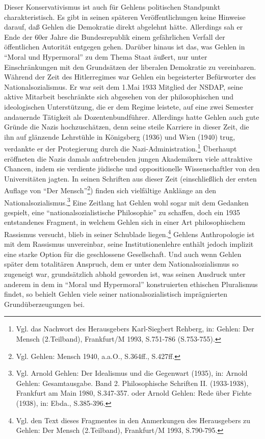 \documentclass[12pt,a4paper]{article}
\begin{document}
Dieser Konservativismus ist auch für Gehlens politischen Standpunkt
charakteristisch. Es gibt in seinen späteren Veröffentlichungen keine
Hinweise darauf, daß Gehlen die Demokratie direkt abgelehnt hätte.
Allerdings sah er Ende der 60er Jahre die Bundesrepublik einem
gefährlichen Verfall der öffentlichen Autorität entgegen gehen. Darüber
hinaus ist das, was Gehlen in "`Moral und Hypermoral"' zu dem Thema
Staat äußert, nur unter Einschränkungen mit den Grundsätzen der
liberalen Demokratie zu vereinbaren. Während der Zeit des Hitlerregimes
war Gehlen ein begeisterter Befürworter des Nationalsozialismus. Er war
seit dem 1.Mai 1933 Mitglied der NSDAP, seine aktive Mitarbeit
beschränkte sich abgesehen von der philosophischen und ideologischen
Unterstützung, die er dem Regime leistete, auf eine zwei Semester
andauernde Tätigkeit als Dozentenbundführer. Allerdings hatte Gehlen
auch gute Gründe die Nazis hochzuschätzen, denn seine steile Karriere in
dieser Zeit, die ihn auf glänzende Lehrstühle in Königsberg (1936) und
Wien (1940) trug, verdankte er der Protegierung durch die
Nazi-Administration.\footnote{Vgl. das Nachwort des Herausgebers
  Karl-Siegbert Rehberg, in: Gehlen: Der Mensch (2.Teilband),
  Frankfurt/M 1993, S.751-786 (S.753-755).} Überhaupt eröffneten die
Nazis damals aufstrebenden jungen Akademikern viele attraktive Chancen,
indem sie verdiente jüdische und oppositionelle Wissenschaftler von den
Universitäten jagten. In seinen Schriften aus dieser Zeit
(einschließlich der ersten Auflage von "`Der Mensch"'\footnote{Vgl.
  Gehlen: Mensch 1940, a.a.O., S.364ff., S.427ff.})  finden sich
vielfältige Anklänge an den Nationalsozialismus.\footnote{Vgl. Arnold
  Gehlen: Der Idealismus und die Gegenwart (1935), in: Arnold Gehlen:
  Gesamtausgabe. Band 2.  Philosophische Schriften II. (1933-1938),
  Frankfurt am Main 1980, S.347-357. oder Arnold Gehlen: Rede über
  Fichte (1938), in: Ebda., S.385-396.} Eine Zeitlang hat Gehlen wohl
sogar mit dem Gedanken gespielt, eine "`nationalsozialistische
Philosophie"' zu schaffen, doch ein 1935 entstandenes Fragment, in
welchem Gehlen sich in einer Art philosophischem Rassismus versucht,
blieb in seiner Schublade liegen.\footnote{Vgl. den Text dieses
  Fragmentes in den Anmerkungen des Herausgebers zu Gehlen: Der Mensch
  (2.Teilband), Frankfurt/M 1993, S.790-795.} Gehlens Anthropologie ist
mit dem Rassismus unvereinbar, seine Institutionenlehre enthält jedoch
implizit eine starke Option für die geschlossene Gesellschaft. Und auch
wenn Gehlen später dem totalitären Anspruch, dem er unter dem
Nationalsozialismus so zugeneigt war, grundsätzlich abhold geworden ist,
was seinen Ausdruck unter anderem in dem in "`Moral und Hypermoral"'
konstruierten ethischen Pluralismus findet, so behielt Gehlen viele
seiner nationalsozialistisch imprägnierten Grundüberzeugungen bei.
\end{document}
